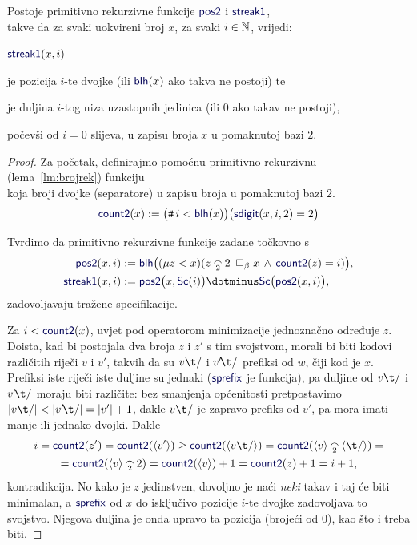 \begin{lema}[{name=[primitivna rekurzivnost raščlambe binarnih zapisa]}]\label{lm:pos2streak1prn}
Postoje primitivno rekurzivne funkcije $\f{pos2}$ i $\f{streak1}$,\\ takve da za svaki uokvireni broj $x$, za svaki $i\in{\mathbb N}$, vrijedi:
\begin{labeling}{$\f{streak1}(x,i)$}
    \item[$\f{pos2}(x,i)$] je pozicija $i$-te dvojke (ili $\f{blh}(x)$ ako takva ne postoji) te
    \item[$\f{streak1}(x,i)$] je duljina $i$-tog niza uzastopnih jedinica (ili $0$ ako takav ne postoji),
\end{labeling}
počevši od $i=0$ slijeva, u zapisu broja $x$ u pomaknutoj bazi $2$.
\end{lema}
\begin{proof}
Za početak, definirajmo pomoćnu primitivno rekurzivnu (lema~\ref{lm:brojrek}) funkciju \\ koja broji dvojke (separatore) u zapisu broja u pomaknutoj bazi $2$.
\begin{equation}
    \f{count2}(x):=\bigl(\num i<\f{blh}(x)\bigr)\bigl(\f{sdigit}(x,i,2)=2\bigr)
\end{equation}

Tvrdimo da primitivno rekurzivne funkcije zadane točkovno s
\begin{align}
    \f{pos2}(x,i)&:=\f{blh}\bigl((\mu z<x)(z\conc22\,\sqsubseteq_\beta x\,\land\,\f{count2}(z)=i)\bigr),\\
    \f{streak1}(x,i)&:=\f{pos2}\bigl(x,\f{Sc}(i)\bigr)\dotminus\f{Sc}\bigl(\f{pos2}(x,i)\bigr),
\end{align}
zadovoljavaju tražene specifikacije.

Za $i<\f{count2}(x)$, uvjet pod operatorom minimizacije jednoznačno određuje $z$. Doista, kad bi postojala dva broja $z$ i $z'$ s tim svojstvom, morali bi biti kodovi različitih riječi $v$ i $v'$, takvih da su $v\t/$ i $v'\!\t/$ prefiksi od $w$, čiji kod je $x$. Prefiksi iste riječi iste duljine su jednaki ($\f{sprefix}$ je funkcija), pa duljine od $v\t/$ i $v'\!\t/$ moraju biti različite: bez smanjenja općenitosti pretpostavimo $\dulj{v\t/}<\dulj{v'\!\t/}=\dulj{v'}+1$, dakle $v\t/$ je zapravo prefiks od $v'$, pa mora imati manje ili jednako dvojki. Dakle
\begin{multline}
    i=\f{count2}(z')=\f{count2}(\kr{v'})\ge\f{count2}(\kr{v\t/})=\f{count2}(\kr v\conc2\kr{\t/})=\\
    =\f{count2}(\kr v\conc22)=\f{count2}(\kr v)+1=\f{count2}(z)+1=i+1\text,
\end{multline}
    kontradikcija. No kako je $z$ jedinstven, dovoljno je naći \emph{neki} takav i taj će biti minimalan, a $\f{sprefix}$ od $x$ do isključivo pozicije $i$-te dvojke zadovoljava to svojstvo. Njegova duljina je onda upravo ta pozicija (brojeći od $0$), kao što i treba biti.


\end{proof}
